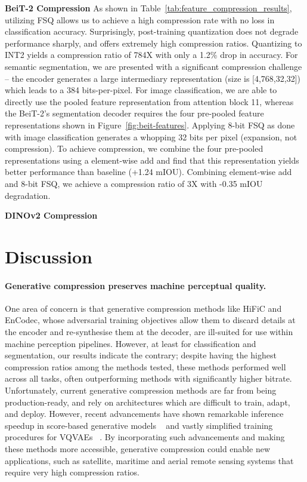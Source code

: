 \documentclass[10pt,twocolumn,letterpaper]{article}
\begin{document}
\textbf{BeiT-2 Compression}
As shown in Table~\ref{tab:feature_compression_results}, utilizing FSQ allows us to achieve a high compression rate with no loss in classification accuracy. Surprisingly, post-training quantization does not degrade performance sharply, and offers extremely high compression ratios. Quantizing to INT2 yields a compression ratio of 784X with only a 1.2\% drop in accuracy. For semantic segmentation, we are presented with a significant compression challenge -- the encoder generates a large intermediary representation (size is [4,768,32,32]) which leads to a 384 bits-per-pixel. For image classification, we are able to directly use the pooled feature representation from attention block 11, whereas the BeiT-2's segmentation decoder requires the four pre-pooled feature representations shown in Figure~\ref{fig:beit-features}. Applying 8-bit FSQ as done with image classification generates a whopping 32 bits per pixel (expansion, not compression). To achieve compression, we combine the four pre-pooled representations using a element-wise add and find that this representation yields better performance than baseline (+1.24 mIOU). Combining element-wise add and 8-bit FSQ, we achieve a compression ratio of 3X with -0.35 mIOU degradation.

\textbf{DINOv2 Compression}

\section{Discussion}

\paragraph{Generative compression preserves machine perceptual quality.} One area of concern is that generative compression methods like HiFiC and EnCodec, whose adversarial training objectives allow them to discard details at the encoder and re-synthesise them at the decoder, are ill-suited for use within machine perception pipelines. However, at least for classification and segmentation, our results indicate the contrary; despite having the highest compression ratios among the methods tested, these methods performed well across all tasks, often outperforming methods with significantly higher bitrate. Unfortunately, current generative compression methods are far from being production-ready, and rely on architectures which are difficult to train, adapt, and deploy. However, recent advancements have shown remarkable inference speedup in score-based generative models ~\cite{song2023consistency} and vastly simplified training procedures for VQVAEs ~\cite{mentzer2023finite}. By incorporating such advancements and making these methods more accessible, generative compression could enable new applications, such as satellite, maritime and aerial remote sensing systems that require very high compression ratios.
\end{document}
